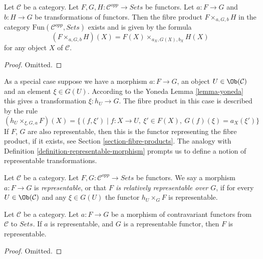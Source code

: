 \begin{lemma}
\label{lemma-fibre-product-presheaves}
Let $\mathcal{C}$ be a category.
Let $F, G, H : \mathcal{C}^{opp} \to \textit{Sets}$
be functors. Let $a : F \to G$ and $b : H \to G$ be
transformations of functors. Then the fibre product
$F \times_{a, G, b} H$ in the category
$\text{Fun}(\mathcal{C}^{opp}, \textit{Sets})$
exists and is given by the formula
$$
(F \times_{a, G, b} H)(X) =
F(X) \times_{a_X, G(X), b_X} H(X)
$$
for any object $X$ of $\mathcal{C}$.
\end{lemma}

\begin{proof}
Omitted.
\end{proof}

\noindent
As a special case suppose we have a morphism
$a : F \to G$, an object $U \in \Ob(\mathcal{C})$
and an element $\xi \in G(U)$. According to the Yoneda
Lemma \ref{lemma-yoneda} this gives a transformation
$\xi : h_U \to G$. The fibre product in this case
is described by the rule
$$
(h_U \times_{\xi, G, a} F)(X) =
\{ (f, \xi') \mid f : X \to U, \ \xi' \in F(X), \ G(f)(\xi) = a_X(\xi')\}
$$
If $F$, $G$ are also representable, then this is the functor representing the
fibre product, if it exists, see Section \ref{section-fibre-products}.
The analogy with Definition \ref{definition-representable-morphism}
prompts us to define a notion
of representable transformations.

\begin{definition}
\label{definition-representable-map-presheaves}
Let $\mathcal{C}$ be a category.
Let $F, G : \mathcal{C}^{opp} \to \textit{Sets}$
be functors. We say a morphism $a : F \to G$ is
{\it representable}, or that {\it $F$ is relatively representable
over $G$}, if for every $U \in \Ob(\mathcal{C})$
and any $\xi \in G(U)$ the functor
$h_U \times_G F$ is representable.
\end{definition}

\begin{lemma}
\label{lemma-representable-over-representable}
Let $\mathcal{C}$ be a category.
Let $a : F \to G$ be a morphism of contravariant functors
from $\mathcal{C}$ to $\textit{Sets}$. If $a$ is representable,
and $G$ is a representable functor, then $F$ is representable.
\end{lemma}

\begin{proof}
Omitted.
\end{proof}

